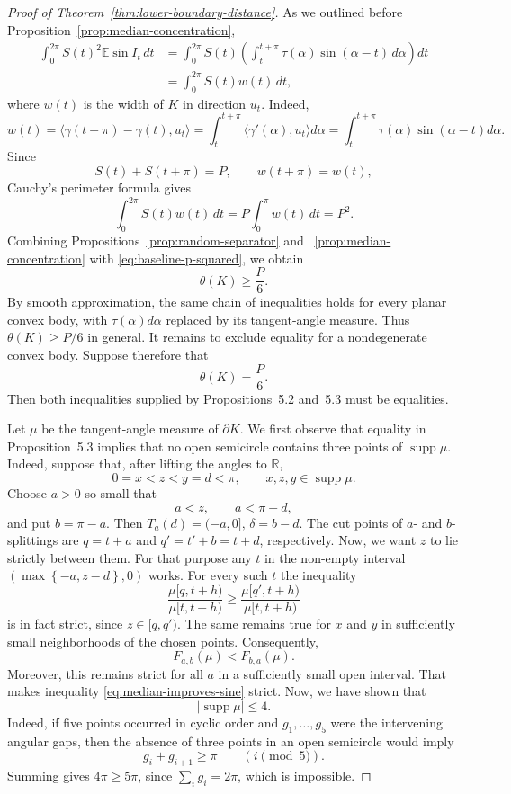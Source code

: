 \documentclass[final,12pt]{elsarticle}
\numberwithin{equation}{section}
\theoremstyle{remark}
\theoremstyle{definition}
\begin{document}
\begin{proof}[Proof of Theorem~\ref{thm:lower-boundary-distance}]
As we outlined before Proposition~\ref{prop:median-concentration},
\begin{equation}\label{eq:one-sample-baseline}
\begin{aligned}
    \int_0^{2\pi}S(t)^2\mathbb E\sin I_t\,dt
    &=\int_0^{2\pi}S(t)
      \left(\int_t^{t+\pi}\tau(\alpha)\sin(\alpha-t)\,d\alpha\right)dt\\
    &=\int_0^{2\pi}S(t)w(t)\,dt,
\end{aligned}
\end{equation}
where $w(t)$ is the width of $K$ in direction $u_t$. Indeed, $$w(t) = \langle \gamma(t+\pi) - \gamma(t), u_t \rangle = \int_t^{t+\pi}\langle \gamma'(\alpha), u_t \rangle d\alpha = \int_t^{t+\pi} \tau(\alpha)\sin(\alpha-t) d\alpha.$$ Since
$$
    S(t)+S(t+\pi)=P,
    \qquad
    w(t+\pi)=w(t),
$$
Cauchy's perimeter formula gives
\begin{equation}\label{eq:baseline-p-squared}
    \int_0^{2\pi}S(t)w(t)\,dt
    =P\int_0^\pi w(t)\,dt=P^2.
\end{equation}
Combining Propositions~\ref{prop:random-separator} and ~\ref{prop:median-concentration} with
\eqref{eq:baseline-p-squared}, we obtain
$$
    \theta(K)\ge \frac{P}{6}.
$$
By smooth approximation, the same chain of inequalities holds for every planar convex body, with \(\tau(\alpha)d\alpha\) replaced by its tangent-angle measure. Thus \(\theta(K)\ge P/6\) in general. It remains to exclude equality for a nondegenerate convex body.
Suppose therefore that
\[
    \theta(K)=\frac{P}{6}.
\]
Then both inequalities supplied by Propositions~5.2 and~5.3 must be
equalities.

Let $\mu$ be the tangent-angle measure of $\partial K$. We first
observe that equality in Proposition~5.3 implies that no open
semicircle contains three points of $\operatorname{supp} \mu$. Indeed, suppose that,
after lifting the angles to $\mathbb R$,
\[
    0=x<z<y=d<\pi,
    \qquad x,z,y\in\operatorname{supp}\mu.
\]
 Choose $a>0$ so small that
\[
    a<z,
    \qquad
    a<\pi-d,
\]
and put $b=\pi-a$.  Then $T_a(d) = (-a,0], \, \delta=b-d$. The cut points of $a$- and $b$-splittings are $q=t+a$ and $q'=t'+b=t+d$, respectively. Now, we want $z$ to lie strictly between them. For that purpose any $t$ in the non-empty interval $(\max\left\{-a, z-d\right\},0)$ works. For every such $t$ the inequality 
$$    \frac{\mu[q,t+h)}{\mu[t,t+h)}\ge
    \frac{\mu[q',t+h)}{\mu[t,t+h)}$$
is in fact strict, since $z \in [q,q')$. The same
remains true for $x$ and $y$ in sufficiently small neighborhoods of
the chosen points. Consequently,
\[
    F_{a,b}(\mu)<F_{b,a}(\mu).
\]
Moreover, this remains strict for all $a$ in a sufficiently small
open interval. That makes inequality \ref{eq:median-improves-sine} strict.
Now, we have shown that
\[
    |\operatorname{supp}\mu|\le4.
\]
Indeed, if five points occurred in cyclic order and $g_1,\ldots,g_5$
were the intervening angular gaps, then the absence of three points
in an open semicircle would imply
\[
    g_i+g_{i+1}\ge\pi
    \qquad (i\!\!\!\pmod 5).
\]
Summing gives $4\pi\ge5\pi$, since $\sum_i g_i=2\pi$, which is
impossible.


\end{proof}
\end{document}
